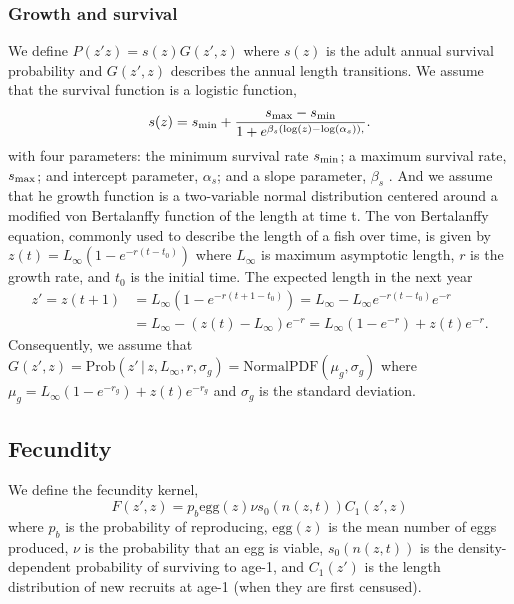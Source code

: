 \documentclass[11pt,oneside]{amsart}
\def\ds{\displaystyle}
\theoremstyle{definition}
\begin{document}
\subsubsection{Growth and survival}
We define $P(z'z) = s(z)G(z',z)$ where $s(z)$ is the adult annual survival probability and $G(z',z)$ describes the annual length transitions. We assume that the survival function is a logistic function,
\begin{equation}\label{eq:surv}
s(z) = s_{\rm min} + \frac{s_{\rm max}-s_{\rm min}}{1+e^{\beta_s(\log(z)-\log(\alpha_s)),}}.
\end{equation}
with four parameters: the minimum survival rate $s_{\rm min}$; a maximum survival rate, $s_{\rm max}$; and intercept parameter, $\alpha_{s}$; and a slope parameter, $\beta_{s}$ \citep{bolker2008ecological}. And we assume that he growth function is a two-variable normal distribution centered around a modified von Bertalanffy function of the length at time t.  The von Bertalanffy equation, commonly used to describe the length of a fish over time, is given by $\ds z(t) = L_{\infty} \left(1-e^{-r(t-t_0)} \right)$ where $L_\infty$ is maximum asymptotic length, $r$ is the growth rate, and $t_0$ is the initial time. The expected length in the next year
\begin{align*}
 z' =z(t+1) & =  L_{\infty} \left(1-e^{-r(t+1-t_0)} \right) =  L_{\infty} - L_{\infty}e^{-r(t-t_0)} e^{-r} \\
 & =   L_\infty - \left( z(t)-L_\infty \right) e^{-r} =   L_{\infty} \left(1-e^{-r} \right) + z(t)e^{-r}. 
 \end{align*}
Consequently, we assume that 
$\ds G(z',z) = \mathrm{Prob}(z' \, | \,  z, L_{\infty}, r, \sigma_g) = \mathrm{Normal PDF}(\mu_g, \sigma_g)$
where $\mu_g =  L_{\infty} \left(1-e^{-r_g} \right) + z(t)e^{-r_g}$ and $\sigma_g$ is the standard deviation.

\subsection{Fecundity}
We define the fecundity kernel, 
\begin{equation}\label{eq:fecundity}
F(z',z) = p_b \mbox{egg}(z) \nu s_0(n(z,t))C_1(z', z)
\end{equation}
where $p_b$ is the probability of reproducing, $\mbox{egg}(z)$ is the mean number of eggs produced, $\nu$ is the probability that an egg is viable, $s_0(n(z,t))$ is the density-dependent probability of surviving to age-1, and $C_1 (z')$ is the length distribution of new recruits at age-1 (when they are first censused).
\end{document}
